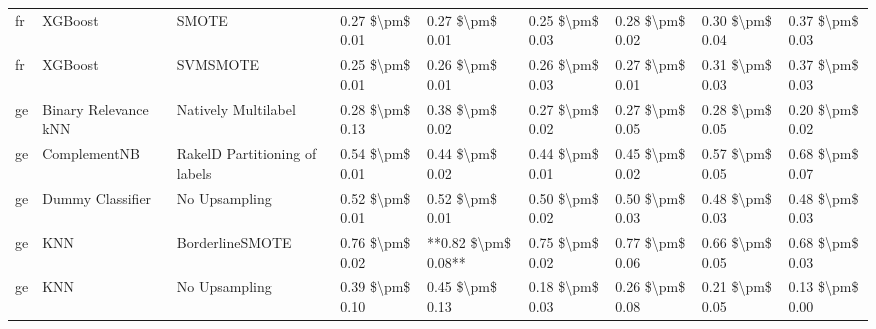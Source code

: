 \begin{tabular}{lllllllll}
      fr &                         XGBoost &                         SMOTE &     0.27 \$\textbackslash pm\$ 0.01 &           0.27 \$\textbackslash pm\$ 0.01 &       0.25 \$\textbackslash pm\$ 0.03 &        0.28 \$\textbackslash pm\$ 0.02 &                         0.30 \$\textbackslash pm\$ 0.04 &     0.37 \$\textbackslash pm\$ 0.03 \\
      fr &                         XGBoost &                      SVMSMOTE &     0.25 \$\textbackslash pm\$ 0.01 &           0.26 \$\textbackslash pm\$ 0.01 &       0.26 \$\textbackslash pm\$ 0.03 &        0.27 \$\textbackslash pm\$ 0.01 &                         0.31 \$\textbackslash pm\$ 0.03 &     0.37 \$\textbackslash pm\$ 0.03 \\
      ge &            Binary Relevance kNN &           Natively Multilabel &     0.28 \$\textbackslash pm\$ 0.13 &           0.38 \$\textbackslash pm\$ 0.02 &       0.27 \$\textbackslash pm\$ 0.02 &        0.27 \$\textbackslash pm\$ 0.05 &                         0.28 \$\textbackslash pm\$ 0.05 &     0.20 \$\textbackslash pm\$ 0.02 \\
      ge &                    ComplementNB & RakelD Partitioning of labels &     0.54 \$\textbackslash pm\$ 0.01 &           0.44 \$\textbackslash pm\$ 0.02 &       0.44 \$\textbackslash pm\$ 0.01 &        0.45 \$\textbackslash pm\$ 0.02 &                         0.57 \$\textbackslash pm\$ 0.05 &     0.68 \$\textbackslash pm\$ 0.07 \\
      ge &                Dummy Classifier &                 No Upsampling &     0.52 \$\textbackslash pm\$ 0.01 &           0.52 \$\textbackslash pm\$ 0.01 &       0.50 \$\textbackslash pm\$ 0.02 &        0.50 \$\textbackslash pm\$ 0.03 &                         0.48 \$\textbackslash pm\$ 0.03 &     0.48 \$\textbackslash pm\$ 0.03 \\
      ge &                             KNN &               BorderlineSMOTE &     0.76 \$\textbackslash pm\$ 0.02 &       **0.82 \$\textbackslash pm\$ 0.08** &       0.75 \$\textbackslash pm\$ 0.02 &        0.77 \$\textbackslash pm\$ 0.06 &                         0.66 \$\textbackslash pm\$ 0.05 &     0.68 \$\textbackslash pm\$ 0.03 \\
      ge &                             KNN &                 No Upsampling &     0.39 \$\textbackslash pm\$ 0.10 &           0.45 \$\textbackslash pm\$ 0.13 &       0.18 \$\textbackslash pm\$ 0.03 &        0.26 \$\textbackslash pm\$ 0.08 &                         0.21 \$\textbackslash pm\$ 0.05 &     0.13 \$\textbackslash pm\$ 0.00 \\

\end{tabular}
